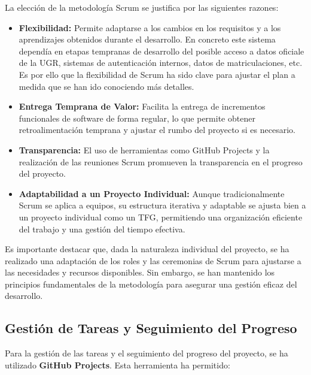 La elección de la metodología Scrum se justifica por las siguientes razones:

\begin{itemize}
    \item \textbf{Flexibilidad:} Permite adaptarse a los cambios en los requisitos y a los aprendizajes obtenidos durante el desarrollo. En concreto este sistema dependía en etapas tempranas de desarrollo del posible acceso a datos oficiale de la UGR, sistemas de autenticación internos, datos de matriculaciones, etc. Es por ello que la flexibilidad de Scrum ha sido clave para ajustar el plan a medida que se han ido conociendo más detalles.
    \item \textbf{Entrega Temprana de Valor:} Facilita la entrega de incrementos funcionales de software de forma regular, lo que permite obtener retroalimentación temprana y ajustar el rumbo del proyecto si es necesario.
    \item \textbf{Transparencia:} El uso de herramientas como GitHub Projects y la realización de las reuniones Scrum promueven la transparencia en el progreso del proyecto.
    \item \textbf{Adaptabilidad a un Proyecto Individual:} Aunque tradicionalmente Scrum se aplica a equipos, su estructura iterativa y adaptable se ajusta bien a un proyecto individual como un TFG, permitiendo una organización eficiente del trabajo y una gestión del tiempo efectiva.
\end{itemize}

Es importante destacar que, dada la naturaleza individual del proyecto, se ha realizado una adaptación de los roles y las ceremonias de Scrum para ajustarse a las necesidades y recursos disponibles. 
Sin embargo, se han mantenido los principios fundamentales de la metodología para asegurar una gestión eficaz del desarrollo.

\subsection{Gestión de Tareas y Seguimiento del Progreso}

Para la gestión de las tareas y el seguimiento del progreso del proyecto, se ha utilizado \textbf{GitHub Projects}. Esta herramienta ha permitido:


